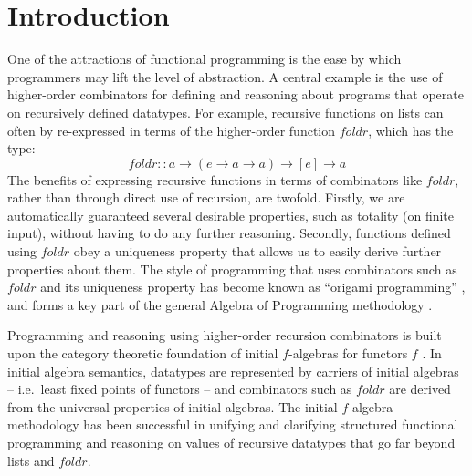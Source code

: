 \documentclass{jfp1}
\begin{document}
\section{Introduction}

One of the attractions of functional programming is the ease by which
programmers may lift the level of abstraction. A central example is
the use of higher-order combinators for defining and reasoning about
programs that operate on recursively defined datatypes. For example,
recursive functions on lists can often by re-expressed in terms of the
higher-order function $\mathit{foldr}$, which has the type:
\begin{displaymath}
  \mathit{foldr} :: a \to (e \to a \to a) \to [e] \to a
\end{displaymath}
The benefits of expressing recursive functions in terms of combinators
like $\mathit{foldr}$, rather than through direct use of recursion,
are twofold. Firstly, we are automatically guaranteed several
desirable properties, such as totality (on finite input), without
having to do any further reasoning. Secondly, functions defined using
$\mathit{foldr}$ obey a uniqueness property that allows us to easily
derive further properties about them. The style of
programming that uses combinators such as $\mathit{foldr}$ and its
uniqueness property has become known as ``origami programming''
\cite{gibbons03origami}, and forms a key part of the general Algebra
of Programming methodology \cite{bdm97}.

Programming and reasoning using higher-order recursion combinators is
built upon the category theoretic foundation of initial $f$-algebras
for functors $f$ \cite{GoguenTW78}. In initial algebra semantics,
datatypes are represented by carriers of initial algebras --
i.e.~least fixed points of functors -- and combinators such as
$\mathit{foldr}$ are derived from the universal properties of initial
algebras. The initial $f$-algebra methodology has been successful in
unifying and clarifying structured functional programming and
reasoning on values of recursive datatypes that go far beyond lists
and $\mathit{foldr}$.
\end{document}
